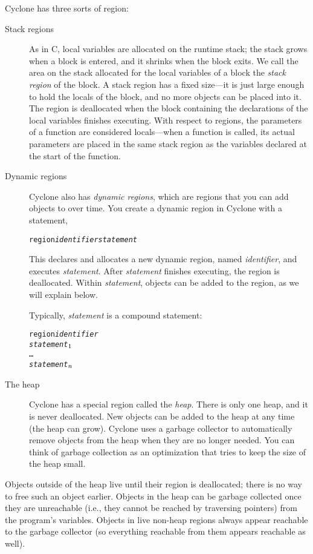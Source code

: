 Cyclone has three sorts of region:
\begin{description}
\item[Stack regions] As in C, local variables are allocated on the
  runtime stack; the stack grows when a block is entered, and it
  shrinks when the block exits.  We call the area on the stack
  allocated for the local variables of a block the \emph{stack region}
  of the block.  A stack region has a fixed size---it is just large
  enough to hold the locals of the block, and no more objects can be
  placed into it.  The region is deallocated when the block containing
  the declarations of the local variables finishes executing.  With
  respect to regions, the parameters of a function are considered
  locals---when a function is called, its actual parameters are placed
  in the same stack region as the variables declared at the start of
  the function.
  
\item[Dynamic regions] Cyclone also has \emph{dynamic regions},
  which are regions that you can add objects to over time.  You create
  a dynamic region in Cyclone with a statement,
\begin{alltt}
  region {\it identifier} {\it statement}
\end{alltt}
  This declares and allocates a new dynamic region, named
  \textit{identifier}, and executes \textit{statement}.  After
  \textit{statement} finishes executing, the region is deallocated.
  Within \textit{statement}, objects can be added to the region, as we
  will explain below.

  Typically, \textit{statement} is a compound statement:
\begin{alltt}
  region \textit{identifier} \lb
    {\it statement}\(\sb{1}\)
    \ldots
    {\it statement}\(\sb{n}\)
  \rb
\end{alltt}

\item[The heap] Cyclone has a special region called the \emph{heap}.
  There is only one heap, and it is never deallocated.  New objects
  can be added to the heap at any time (the heap can grow).  Cyclone
  uses a garbage collector to automatically remove objects from the
  heap when they are no longer needed.  You can think of garbage
  collection as an optimization that tries to keep the size of the
  heap small.
\end{description}

Objects outside of the heap live until their region is deallocated;
there is no way to free such an object earlier.  Objects in the heap
can be garbage collected once they are unreachable (i.e., they cannot
be reached by traversing pointers) from the program's variables.
Objects in live non-heap regions always appear reachable to the
garbage collector (so everything reachable from them appears reachable
as well).

